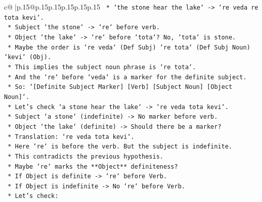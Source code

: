 \documentclass{article}
\begin{document}
{\begin{supertabular}{c@{$\;$}|p{.15\linewidth}@{}p{.15\linewidth}p{.15\linewidth}p{.15\linewidth}p{.15\linewidth}p{.15\linewidth}}
{{{\texttt{                                            *   `the stone hear the lake` {-}> `re veda re tota kevi`.} \\
\texttt{                                                *   Subject `the stone` {-}> `re` before verb.} \\
\texttt{                                                *   Object `the lake` {-}> `re` before `tota`? No, `tota` is stone.} \\
\texttt{                                                *   Maybe the order is `re veda` (Def Subj) `re tota` (Def Subj Noun) `kevi` (Obj).} \\
\texttt{                                                *   This implies the subject noun phrase is `re tota`.} \\
\texttt{                                                *   And the `re` before `veda` is a marker for the definite subject.} \\
\texttt{                                                *   So: `{[}Definite Subject Marker{]} {[}Verb{]} {[}Subject Noun{]} {[}Object Noun{]}`.} \\
\texttt{                                                *   Let's check `a stone hear the lake` {-}> `re veda tota kevi`.} \\
\texttt{                                                    *   Subject `a stone` (indefinite) {-}> No marker before verb.} \\
\texttt{                                                    *   Object `the lake` (definite) {-}> Should there be a marker?} \\
\texttt{                                                    *   Translation: `re veda tota kevi`.} \\
\texttt{                                                    *   Here `re` is before the verb. But the subject is indefinite.} \\
\texttt{                                                    *   This contradicts the previous hypothesis.} \\
\texttt{                                                    *   Maybe `re` marks the **Object** definiteness?} \\
\texttt{                                                    *   If Object is definite {-}> `re` before Verb.} \\
\texttt{                                                    *   If Object is indefinite {-}> No `re` before Verb.} \\
\texttt{                                                    *   Let's check:} \\
}}}
\end{supertabular}}
\end{document}
